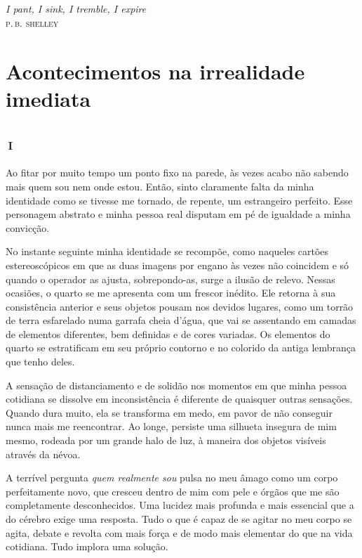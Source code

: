 \chapter*{}
\thispagestyle{empty}

\vfill
\begin{flushright}
\textit{I pant, I sink, I tremble, I expire}\\
{\centering\textsc{p.\,b. shelley}}
\end{flushright}

\part{Acontecimentos na irrealidade imediata}

\openany
\chapter*{\small{}\,\Large\centering\textsc{i}\,\small{}}

Ao fitar por muito tempo um ponto fixo na parede, às vezes acabo não sabendo mais quem sou nem onde estou. Então, sinto claramente falta da minha identidade como se tivesse me tornado, de repente, um estrangeiro perfeito. Esse personagem abstrato e minha pessoa real disputam em pé de igualdade a minha convicção.

No instante seguinte minha identidade se recompõe, como naqueles cartões estereoscópicos em que as duas imagens por engano às vezes não coincidem e só quando o operador as ajusta, sobrepondo-as, surge a ilusão de relevo. Nessas ocasiões, o quarto se me apresenta com um frescor inédito. Ele retorna à sua consistência anterior e seus objetos pousam nos devidos lugares, como um torrão de terra esfarelado numa garrafa cheia d'água, que vai se assentando em camadas de elementos diferentes, bem definidas e de cores variadas. Os elementos do quarto se estratificam em seu próprio contorno e no colorido da antiga lembrança que tenho deles.

A sensação de distanciamento e de solidão nos momentos em que minha pessoa cotidiana se dissolve em inconsistência é diferente de quaisquer outras sensações. Quando dura muito, ela se transforma em medo, em pavor de não conseguir nunca mais me reencontrar. Ao longe, persiste uma silhueta insegura de mim mesmo, rodeada por um grande halo de luz, à maneira dos objetos visíveis através da névoa.

A terrível pergunta \textit{quem realmente sou} pulsa no meu âmago como um corpo perfeitamente novo, que cresceu dentro de mim com pele e órgãos que me são completamente desconhecidos. Uma lucidez mais profunda e mais essencial que a do cérebro exige uma resposta. Tudo o que é capaz de se agitar no meu corpo se agita, debate e revolta com mais força e de modo mais elementar do que na vida cotidiana. Tudo implora uma solução.

